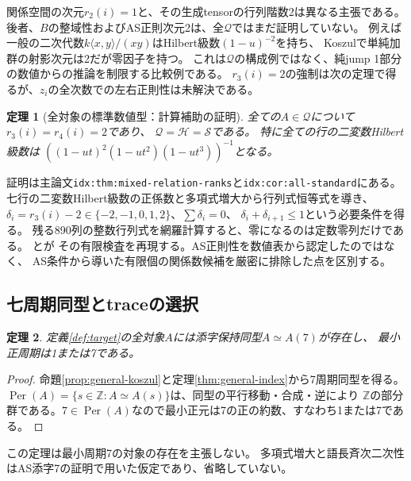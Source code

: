 \documentclass[11pt,a4paper]{ltjsarticle}
\newtheorem{theorem}{定理}[section]
\theoremstyle{definition}
\newcommand{\ZZ}{\mathbb Z}
\newcommand{\Per}{\operatorname{Per}}
\begin{document}
関係空間の次元$r_2(i)=1$と、その生成tensorの行列階数2は異なる主張である。
後者、$B$の整域性およびAS正則次元2は、全$\mathcal Q$ではまだ証明していない。
例えば一般の二次代数$k\langle x,y\rangle/(xy)$はHilbert級数$(1-u)^{-2}$を持ち、
Koszulで単純加群の射影次元は2だが零因子を持つ。
これは$\mathcal Q$の構成例ではなく、純jump 1部分の数値からの推論を制限する比較例である。
$r_3(i)=2$の強制は次の定理で得るが、$z_i$の全次数での左右正則性は未解決である。

\begin{theorem}[全対象の標準数値型：計算補助の証明]
\label{thm:all-standard-summary}
全ての$A\in\mathcal Q$について$r_3(i)=r_4(i)=2$であり、
$\mathcal Q=\mathcal H=\mathcal S$である。
特に全ての行の二変数Hilbert級数は
$((1-ut)^2(1-ut^2)(1-ut^3))^{-1}$となる。
\end{theorem}
証明は主論文\texttt{idx:thm:mixed-relation-ranks}と\texttt{idx:cor:all-standard}にある。
七行の二変数Hilbert級数の正係数と多項式増大から行列式恒等式を導き、
$\delta_i=r_3(i)-2\in\{-2,-1,0,1,2\}$、$\sum\delta_i=0$、
$\delta_i+\delta_{i+1}\leq1$という必要条件を得る。
残る890列の整数行列式を網羅計算すると、零になるのは定数零列だけである。
とが
その有限検査を再現する。AS正則性を数値表から認定したのではなく、
AS条件から導いた有限個の関係数候補を厳密に排除した点を区別する。

\subsection{七周期同型とtraceの選択}
\begin{theorem}\label{thm:seven-period}
定義\ref{def:target}の全対象$A$には添字保持同型$A\simeq A(7)$が存在し、
最小正周期は1または7である。
\end{theorem}
\begin{proof}
命題\ref{prop:general-koszul}と定理\ref{thm:general-index}から7周期同型を得る。
$\Per(A)=\{s\in\ZZ:A\simeq A(s)\}$は、同型の平行移動・合成・逆により
$\ZZ$の部分群である。$7\in\Per(A)$なので最小正元は7の正の約数、すなわち1または7である。
\end{proof}
この定理は最小周期7の対象の存在を主張しない。
多項式増大と語長斉次二次性はAS添字7の証明で用いた仮定であり、省略していない。
\end{document}
